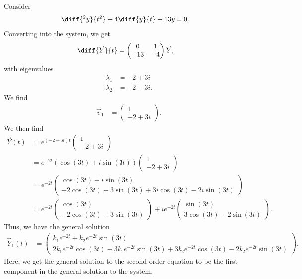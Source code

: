 \documentclass[10pt]{mypackage}
\begin{document}
\begin{example}
  Consider
  \begin{align*}
    \diff{^2y}{t^2} + 4\diff{y}{t} + 13y &= 0.
  \end{align*}
  Converting into the system, we get
  \begin{align*}
    \diff{\vec{Y}}{t} &= \begin{pmatrix}0 & 1 \\ -13 & -4\end{pmatrix} \vec{Y},
  \end{align*}
  with eigenvalues
  \begin{align*}
    \lambda_1 &= -2 + 3i\\
    \lambda_2 &= -2-3i.
  \end{align*}
  We find
  \begin{align*}
    \vec{v}_1 &= \begin{pmatrix}1\\-2+3i\end{pmatrix}.
  \end{align*}
  We then find
  \begin{align*}
    \vec{Y}(t) &= e^{\left(-2 + 3i\right)t}\begin{pmatrix}1\\-2 + 3i\end{pmatrix}\\
               &= e^{-2t}\left(\cos\left(3t\right) + i\sin\left(3t\right)\right) \begin{pmatrix}1\\-2 + 3i\end{pmatrix}\\
               &= e^{-2t} \begin{pmatrix}\cos\left(3t\right) + i\sin\left(3t\right) \\ -2\cos\left(3t\right) - 3\sin\left(3t\right) + 3i\cos\left(3t\right) - 2i\sin\left(3t\right)\end{pmatrix}\\
               &= e^{-2t}\begin{pmatrix}\cos\left(3t\right)\\-2\cos\left(3t\right) - 3\sin\left(3t\right)\end{pmatrix} + ie^{-2t} \begin{pmatrix}\sin\left(3t\right) \\ 3\cos\left(3t\right) - 2\sin\left(3t\right)\end{pmatrix}.
  \end{align*}
  Thus, we have the general solution
  \begin{align*}
    \vec{Y}_1(t) &= \begin{pmatrix}k_1e^{-2t} + k_2e^{-2t}\sin\left(3t\right) \\ 2k_1e^{-2t}\cos\left(3t\right) - 3k_1e^{-2t}\sin\left(3t\right) + 3k_2e^{-2t}\cos\left(3t\right) - 2k_2e^{-2t}\sin\left(3t\right)\end{pmatrix}.
  \end{align*}
  Here, we get the general solution to the second-order equation to be the first component in the general solution to the system.
\end{example}
\end{document}
